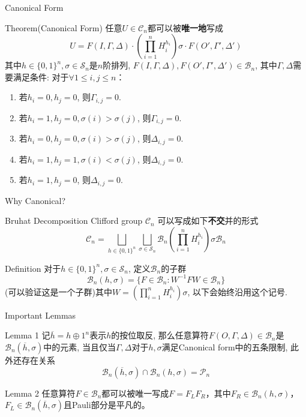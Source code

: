 \documentclass{beamer}
\begin{document}
\begin{frame}{Canonical Form}
	\begin{block}{Theorem(Canonical Form)}
		任意$U \in \mathcal C_n$都可以被\textbf{唯一地}写成
		\begin{equation}
		U = F(I, \Gamma, \Delta) \cdot \left( \prod_{i=1}^nH_i^{h_i} \right)\sigma \cdot F(O', \Gamma', \Delta')
		\label{canonical}
		\end{equation}
		其中$h \in \{0, 1\}^n, \sigma \in \mathcal S_n$是$n$阶排列, $F(I, \Gamma, \Delta), F(O', \Gamma', \Delta') \in \mathcal B_n$, 其中$\Gamma, \Delta$需要满足条件: 对于$\forall 1 \le i, j \le n$：
		\begin{enumerate}
			\item 若$h_i = 0, h_j = 0$, 则$\Gamma_{i, j} = 0$.
			\item 若$h_i = 1, h_j = 0, \sigma(i) > \sigma(j)$, 则$\Gamma_{i, j} = 0$.
			\item 若$h_i = 0, h_j = 0, \sigma(i) > \sigma(j)$, 则$\Delta_{i, j} = 0$.
			\item 若$h_i = 1, h_j = 1, \sigma(i) < \sigma(j)$, 则$\Delta_{i, j} = 0$.
			\item 若$h_i = 1, h_j = 0$, 则$\Delta_{i, j} = 0$.
		\end{enumerate}
	\end{block}
\end{frame}
\begin{frame}{Why Canonical?}
	\begin{block}{Bruhat Decomposition\cite{bruhat}}
	Clifford group $\mathcal C_n$ 可以写成如下\textbf{不交}并的形式
$$\mathcal C_n = \bigsqcup_{h \in \{0, 1\}^n}\bigsqcup_{\sigma \in \mathcal S_n} \mathcal B_n\left(\prod_{i=1}^{n}H_i^{h_i}\right)\sigma\mathcal B_n$$
	\end{block}

	\begin{block}{Definition}
对于$h \in \{0, 1\}^n, \sigma \in \mathcal S_n$, 定义$\mathcal B_n$的子群
$$\mathcal B_n(h, \sigma) = \{F \in \mathcal B_n: W^{-1}FW \in \mathcal B_n\}$$
(可以验证这是一个子群)其中$W = \left(\prod\limits_{i=1}^{n}H_i^{h_i}\right)\sigma$, 以下会始终沿用这个记号.	\end{block}
\end{frame}

\begin{frame}{Important Lemmas}
\begin{block}{Lemma 1}
	记$\overline{h} = h \oplus 1^n$表示$h$的按位取反, 那么任意算符$F(O, \Gamma, \Delta) \in \mathcal B_n$是$\mathcal B_n(\overline{h}, \sigma)$中的元素, 当且仅当$\Gamma, \Delta$对于$h, \sigma$满足Canonical form中的五条限制, 此外还存在关系$$
	\mathcal B_n(\overline{h}, \sigma) \cap \mathcal B_n(h, \sigma) = \mathcal P_n$$
\end{block}
\begin{block}{Lemma 2}
	任意算符$F \in \mathcal B_n$都可以被唯一写成$F = F_LF_R$，其中$F_R \in \mathcal B_n(h, \sigma)$，$F_L \in \mathcal B_n(\overline{h}, \sigma)$且Pauli部分是平凡的。
	\label{lemma2-2}
\end{block}
\end{frame}
\end{document}
